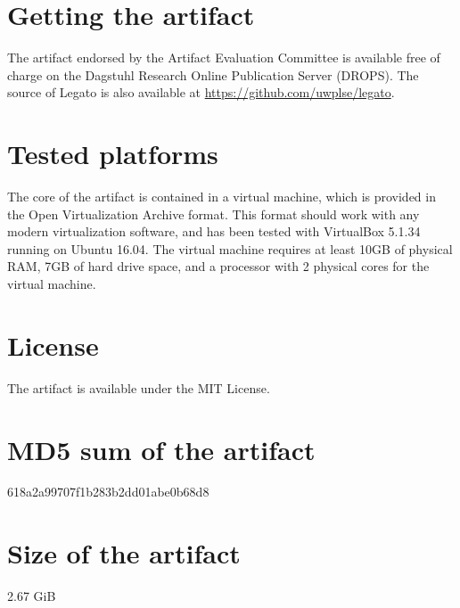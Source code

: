 \documentclass[a4paper,UKenglish]{darts-v2018}
\newenvironment{getting}{\section{Getting the artifact} The artifact 
endorsed by the Artifact Evaluation Committee is available free of 
charge on the Dagstuhl Research Online Publication Server (DROPS).}{}
\newenvironment{platforms}{\section{Tested platforms}}{}
\newcommand{\license}[1]{{\section{License}#1}}
\newcommand{\mdsum}[1]{{\section{MD5 sum of the artifact}#1}}
\newcommand{\artifactsize}[1]{{\section{Size of the artifact}#1}}
\begin{document}
\begin{getting}
The source of Legato is also available at \url{https://github.com/uwplse/legato}.
\end{getting}

\begin{platforms}
  The core of the artifact is contained in a virtual machine,
  which is provided in the Open Virtualization Archive format.
  This format should work with any modern virtualization software,
  and has been tested with VirtualBox 5.1.34 running on Ubuntu 16.04.
  The virtual machine requires at least 10GB of physical RAM,
  7GB of hard drive space, and a processor with 2 physical cores for the
  virtual machine.
\end{platforms}

\license{The artifact is available under the MIT License.}

\mdsum{618a2a99707f1b283b2dd01abe0b68d8}

\artifactsize{2.67 GiB}
\end{document}
